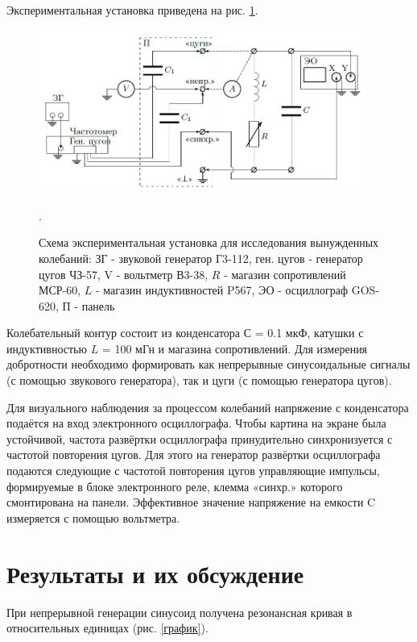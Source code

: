 \documentclass[a4paper,12pt]{article} %
\begin{document}
Экспериментальная установка приведена на рис.  \ref{установка}. 
\begin{figure}[h!]
\begin{center}
\includegraphics[width=0.95\textwidth]{установка}
\caption{Схема экспериментальная установка для исследования вынужденных
колебаний: ЗГ - звуковой генератор Г3-112, ген. цугов - генератор цугов ЧЗ-57, V - вольтметр В3-38, $R$ - магазин сопротивлений МСР-60, $L$ - магазин индуктивностей P567, ЭО - осциллограф GOS-620, П - панель} \label{установка}.
\end{center}
\end{figure} 

Колебательный контур состоит из конденсатора $С $ = 0.1 мкФ, катушки с индуктивностью $L$ = 100 мГн и магазина сопротивлений. Для измерения добротности необходимо формировать как непрерывные синусоидальные сигналы (с помощью звукового генератора), так и цуги (с помощью генератора цугов). 

Для визуального наблюдения за процессом колебаний напряжение с конденсатора подаётся на вход электронного осциллографа. Чтобы картина на экране была устойчивой, частота развёртки осциллографа принудительно синхронизуется с частотой повторения цугов. Для этого на генератор развёртки осциллографа подаются следующие с частотой повторения цугов управляющие импульсы, формируемые в блоке электронного реле, клемма «синхр.» которого смонтирована на панели. Эффективное значение напряжение на емкости C измеряется с помощью вольтметра.

\section{Результаты и их обсуждение}
При непрерывной генерации синусоид получена резонансная кривая в относительных единицах (рис. \ref{график}). 
\end{document}
